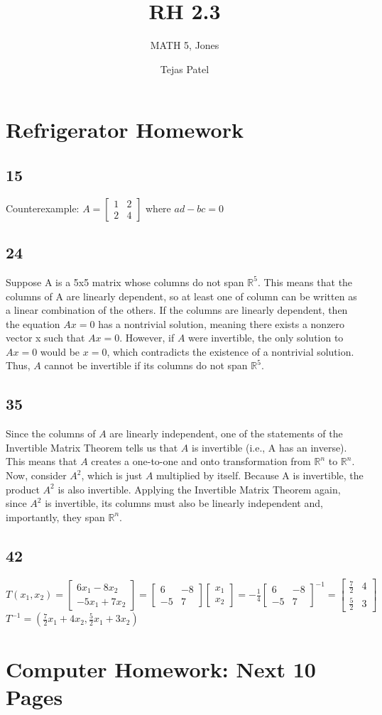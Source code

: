 \documentclass{article}
\title{RH 2.3}
\author{MATH 5, Jones}
\date{Tejas Patel}
\begin{document}
\maketitle
\section*{Refrigerator Homework}
\subsection*{15}
Counterexample: $A=\begin{bmatrix}1&2\\2&4\end{bmatrix}$ where $ad-bc=0$
\subsection*{24}
Suppose A is a 5x5 matrix whose columns do not span $\mathbb{R}^5$. This means that the columns of A are linearly dependent, so at least one of column can be written as a linear combination of the others.
If the columns are linearly dependent, then the equation $Ax=0$ has a nontrivial solution, meaning there exists a nonzero vector x such that $Ax=0$.
However, if $A$ were invertible, the only solution to $Ax=0$ would be $x=0$, which contradicts the existence of a nontrivial solution. Thus, $A$ cannot be invertible if its columns do not span $\mathbb{R}^5$.
\subsection*{35}
Since the columns of $A$ are linearly independent, one of the statements of the Invertible Matrix Theorem tells us that $A$ is invertible (i.e., A has an inverse). This means that $A$ creates a one-to-one and onto transformation from $\mathbb{R}^n$ to $\mathbb{R}^n$. Now, consider $A^2$, which is just $A$ multiplied by itself. Because A is invertible, the product $A^2$ is also invertible. Applying the Invertible Matrix Theorem again, since $A^2$ is invertible, its columns must also be linearly independent and, importantly, they span $\mathbb{R}^n$.
\subsection*{42}
$T(x_1,x_2)=\begin{bmatrix}6x_1-8x_2\\-5x_1+7x_2\end{bmatrix} = \begin{bmatrix}6&-8\\-5&7\end{bmatrix}\begin{bmatrix}x_1\\x_2\end{bmatrix} = -\frac{1}{4} \begin{bmatrix}6&-8\\-5&7\end{bmatrix}^{-1}=\begin{bmatrix}\frac{7}{2} & 4 \\[0.1in] \frac{5}{2} & 3\end{bmatrix}$
\\$T^{-1}=\left(\frac{7}{2}x_1+4x_2, \frac{5}{2}x_1+3x_2\right)$
\pagebreak
\section*{Computer Homework: Next 10 Pages}
\end{document}
